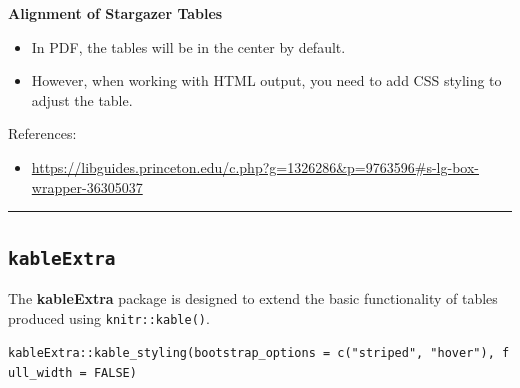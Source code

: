 \documentclass[
  a4paper,
  twoside,
  openright]{book}
\providecommand{\tightlist}{%
  \setlength{\itemsep}{0pt}\setlength{\parskip}{0pt}}
\theoremstyle{definition}
\theoremstyle{definition}
\theoremstyle{definition}
\theoremstyle{definition}
\theoremstyle{remark}
\begin{document}
\textbf{Alignment of Stargazer Tables}

\begin{itemize}
\item
  In PDF, the tables will be in the center by default.
\item
  However, when working with HTML output, you need to add CSS styling to adjust the table.
\end{itemize}

References:

\begin{itemize}
\tightlist
\item
  \url{https://libguides.princeton.edu/c.php?g=1326286&p=9763596\#s-lg-box-wrapper-36305037}
\end{itemize}

\begin{center}\rule{0.5\linewidth}{0.5pt}\end{center}

\subsection{\texorpdfstring{\texttt{kableExtra}}{kableExtra}}\label{kableextra}

The \textbf{kableExtra} package is designed to extend the basic functionality of tables produced using \texttt{knitr::kable()}.

\texttt{kableExtra::kable\_styling(bootstrap\_options\ =\ c("striped",\ "hover"),\ full\_width\ =\ FALSE)}
\end{document}

